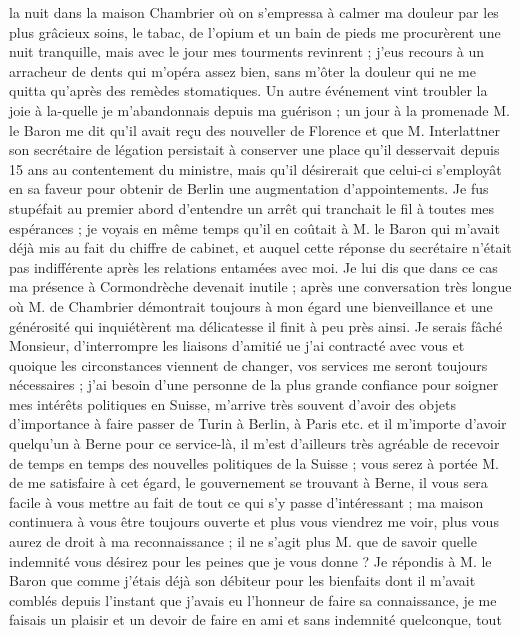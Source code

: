 \documentclass[12pt]{article}
\begin{document}
 la nuit dans la maison Chambrier où on
s’empressa à calmer ma douleur par les plus grâcieux soins, le tabac, de l’opium et un bain de pieds
me procurèrent une nuit tranquille, mais avec le jour mes tourments revinrent ; j’eus recours à un
arracheur de dents qui m’opéra assez bien, sans m’ôter la douleur qui ne me quitta qu’après des
remèdes stomatiques. Un autre événement vint troubler la joie à la-quelle je m’abandonnais depuis ma
guérison ; un jour à la promenade M. le Baron me dit qu’il avait reçu des nouveller de Florence et
que M. Interlattner son secrétaire de légation persistait à conserver une place qu’il desservait
depuis 15 ans au contentement du ministre, mais qu’il désirerait que celui-ci s’employât en sa
faveur pour obtenir de Berlin une augmentation d’appointements. Je fus stupéfait au premier abord
d’entendre un arrêt qui tranchait le fil à toutes mes espérances ; je voyais en même temps qu’il en
coûtait à M. le Baron qui m’avait déjà mis au fait du chiffre de cabinet, et auquel cette réponse du
secrétaire n’était pas indifférente après les relations entamées avec moi. Je lui dis que dans ce
cas ma présence à Cormondrèche devenait inutile ; après une conversation très longue où M. de
Chambrier démontrait toujours à mon égard une bienveillance et une générosité qui inquiétèrent ma
délicatesse il finit à peu près ainsi. Je serais fâché Monsieur, d’interrompre les liaisons d’amitié
ue j’ai contracté avec vous et quoique les circonstances viennent de changer, vos services me seront
toujours nécessaires ; j’ai besoin d’une personne de la plus grande confiance pour soigner mes
intérêts politiques en Suisse, m’arrive très souvent d’avoir des objets d’importance à faire passer
de Turin à Berlin, à Paris etc. et il m’importe d’avoir quelqu’un à Berne pour ce service-là, il
m’est d’ailleurs très agréable de recevoir de temps en temps des nouvelles politiques de la Suisse ;
vous serez à portée M. de me satisfaire à cet égard, le gouvernement se trouvant à Berne, il vous
sera facile à vous mettre au fait de tout ce qui s’y passe d’intéressant ; ma maison continuera à
vous être toujours ouverte et plus vous viendrez me voir, plus vous aurez de droit à ma
reconnaissance ; il ne s’agit plus M. que de savoir quelle indemnité vous désirez pour les peines
que je vous donne ? Je répondis à M. le Baron que comme j’étais déjà son débiteur pour les bienfaits
dont il m’avait comblés depuis l’instant que j’avais eu l’honneur de faire sa connaissance, je me
faisais un plaisir et un devoir de faire en ami et sans indemnité quelconque, tout
\end{document}
